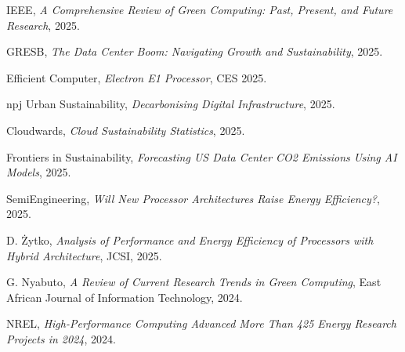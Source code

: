 \documentclass[10pt,a4paper]{article}
\begin{document}
\begin{thebibliography}{9}
IEEE, \textit{A Comprehensive Review of Green Computing: Past, Present, and Future Research}, 2025.

GRESB, \textit{The Data Center Boom: Navigating Growth and Sustainability}, 2025.

Efficient Computer, \textit{Electron E1 Processor}, CES 2025.

npj Urban Sustainability, \textit{Decarbonising Digital Infrastructure}, 2025.

Cloudwards, \textit{Cloud Sustainability Statistics}, 2025.

Frontiers in Sustainability, \textit{Forecasting US Data Center CO2 Emissions Using AI Models}, 2025.

SemiEngineering, \textit{Will New Processor Architectures Raise Energy Efficiency?}, 2025.

D. Żytko, \textit{Analysis of Performance and Energy Efficiency of Processors with Hybrid Architecture}, JCSI, 2025.

G. Nyabuto, \textit{A Review of Current Research Trends in Green Computing}, East African Journal of Information Technology, 2024.

NREL, \textit{High-Performance Computing Advanced More Than 425 Energy Research Projects in 2024}, 2024.
\end{thebibliography}
\end{document}
